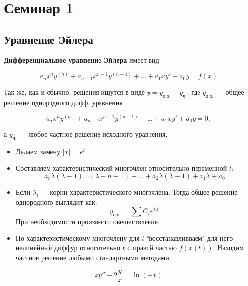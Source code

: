 \newpage

\section{Семинар 1}

\def \ycom {y_{\text{о.о.}}}
\def \ysp {y_{\text{ч.}}}

\subsection{Уравнение Эйлера}

\textbf{Дифференциальное уравнение Эйлера} имеет вид

$$a_n x^n y^{(n)} + a_{n-1} x^{n-1} y^{(n-1)} + \ldots + a_1 x y' + a_0 y = f(x)$$

Так же, как и обычно, решения ищутся в виде $y = \ycom + \ysp$, где $\ycom$ --- общее решение однородного дифф. уравнения

$$a_n x^n y^{(n)} + a_{n-1} x^{n-1} y^{(n-1)} + \ldots + a_1 x y' + a_0 y = 0,$$

а $\ysp$ --- любое частное решение исходного уравнения.

\begin{algo}
\begin{itemize}
  \item Делаем замену $|x| = e^t$
  \item Составляем характеристический многочлен относительно переменной $t$:
    $$a_n\lambda(\lambda-1)...(\lambda - n + 1) + \ldots + a_2\lambda(\lambda - 1) + a_1\lambda + a_0$$
  \item Если $\lambda_i$ --- корни характеристического многочлена. Тогда общее решение однородного выглядит как:
    $$\ycom = \sum C_i e^{\lambda_i t}$$
    При необходимости произвести овеществление.
  \item По характеристическому многочлену для $t$ "восстанавливваем" для него нелинейный диффур относительно $t$
  с правой частью $f(x(t))$. Находим частное решение любыми стандартными методами.
\end{itemize}
\end{algo}

\begin{problem}
  $$xy'' - 2\frac{y}{x} = \ln(-x)$$
\end{problem}

